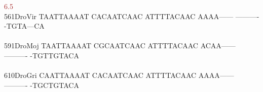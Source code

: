 \documentclass[11pt,twoside,reqno,a4paper]{article}
\begin{document}
{\hspace*{4\charwidth}\hspace*{7\charwidth}\hspace*{1\charwidth}\hspace*{1\charwidth}\hspace*{1\charwidth}\hspace*{31\charwidth}\textcolor{Brown}{6.5}\hspace*{1\charwidth}\hspace*{1\charwidth}\hspace*{1\charwidth}\\
561\hspace*{1\charwidth}DroVir	TAATTAAAAT	CACAATCAAC	ATTTTACAAC	AAAA------	----------	-TGTA---CA	\\
\hspace*{4\charwidth}\hspace*{7\charwidth}\hspace*{1\charwidth}\hspace*{1\charwidth}\hspace*{1\charwidth}\hspace*{1\charwidth}\hspace*{1\charwidth}\hspace*{1\charwidth}\\
591\hspace*{1\charwidth}DroMoj	TAATTAAAAT	CGCAATCAAC	ATTTTACAAC	ACAA------	----------	-TGTTGTACA	\\
\hspace*{4\charwidth}\hspace*{7\charwidth}\hspace*{1\charwidth}\hspace*{1\charwidth}\hspace*{1\charwidth}\hspace*{1\charwidth}\hspace*{1\charwidth}\hspace*{1\charwidth}\\
610\hspace*{1\charwidth}DroGri	CAATTAAAAT	CACAATCAAC	ATTTTACAAC	AAAA------	----------	-TGCTGTACA	\\
\hspace*{4\charwidth}\hspace*{7\charwidth}\hspace*{1\charwidth}\hspace*{1\charwidth}\hspace*{1\charwidth}\hspace*{1\charwidth}\hspace*{1\charwidth}\hspace*{1\charwidth}\\
}
\end{document}
